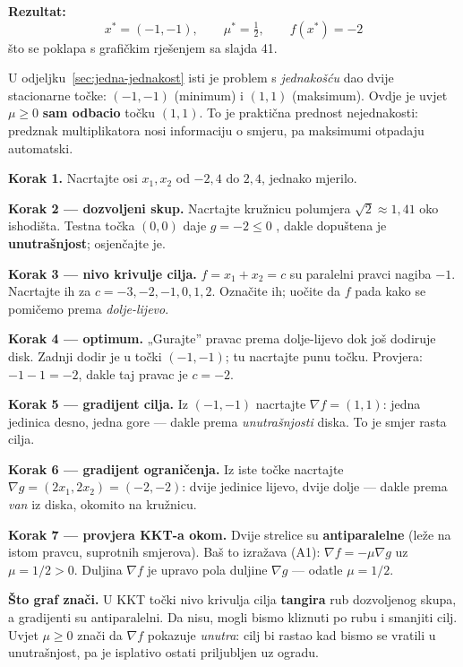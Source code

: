 \textbf{Rezultat:}
\[
x^{*} = (-1,-1), \qquad \mu^{*} = \tfrac12, \qquad f(x^{*}) = -2
\]
što se poklapa s grafičkim rješenjem sa slajda 41. \checkmark

\begin{napomena}
U odjeljku~\ref{sec:jedna-jednakost} isti je problem s \emph{jednakošću} dao dvije
stacionarne točke: $(-1,-1)$ (minimum) i $(1,1)$ (maksimum). Ovdje je uvjet
$\mu \ge 0$ \textbf{sam odbacio} točku $(1,1)$. To je praktična prednost
nejednakosti: predznak multiplikatora nosi informaciju o smjeru, pa maksimumi
otpadaju automatski.
\end{napomena}

\begin{crtanje}
\textbf{Korak 1.} Nacrtajte osi $x_1, x_2$ od $-2{,}4$ do $2{,}4$, jednako
mjerilo.

\textbf{Korak 2 --- dozvoljeni skup.} Nacrtajte kružnicu polumjera
$\sqrt2 \approx 1{,}41$ oko ishodišta. Testna točka $(0,0)$ daje
$g = -2 \le 0$ \checkmark, dakle dopuštena je \textbf{unutrašnjost}; osjenčajte
je.

\textbf{Korak 3 --- nivo krivulje cilja.} $f = x_1+x_2 = c$ su paralelni pravci
nagiba $-1$. Nacrtajte ih za $c = -3, -2, -1, 0, 1, 2$. Označite ih; uočite da
$f$ pada kako se pomičemo prema \emph{dolje-lijevo}.

\textbf{Korak 4 --- optimum.} „Gurajte” pravac prema dolje-lijevo dok još
dodiruje disk. Zadnji dodir je u točki $(-1,-1)$; tu nacrtajte punu točku.
Provjera: $-1-1 = -2$, dakle taj pravac je $c = -2$.

\textbf{Korak 5 --- gradijent cilja.} Iz $(-1,-1)$ nacrtajte
$\nabla f = (1,1)$: jedna jedinica desno, jedna gore --- dakle prema
\emph{unutrašnjosti} diska. To je smjer rasta cilja.

\textbf{Korak 6 --- gradijent ograničenja.} Iz iste točke nacrtajte
$\nabla g = (2x_1, 2x_2) = (-2,-2)$: dvije jedinice lijevo, dvije dolje ---
dakle prema \emph{van} iz diska, okomito na kružnicu.

\textbf{Korak 7 --- provjera KKT-a okom.} Dvije strelice su
\textbf{antiparalelne} (leže na istom pravcu, suprotnih smjerova). Baš to
izražava (A1): $\nabla f = -\mu\nabla g$ uz $\mu = 1/2 > 0$. Duljina $\nabla f$
je upravo pola duljine $\nabla g$ --- odatle $\mu = 1/2$.

\textbf{Što graf znači.} U KKT točki nivo krivulja cilja \textbf{tangira} rub
dozvoljenog skupa, a gradijenti su antiparalelni. Da nisu, mogli bismo kliznuti
po rubu i smanjiti cilj. Uvjet $\mu \ge 0$ znači da $\nabla f$ pokazuje
\emph{unutra}: cilj bi rastao kad bismo se vratili u unutrašnjost, pa je
isplativo ostati priljubljen uz ogradu.
\end{crtanje}


